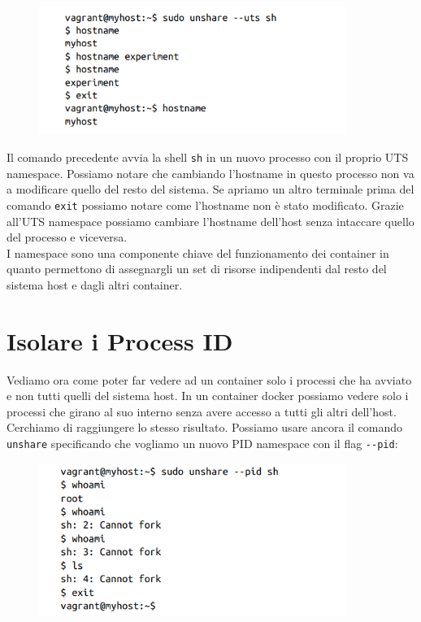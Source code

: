 \begin{figure}[H]
    \centering
    \includegraphics[width=10cm, keepaspectratio]{capitoli/os_security/imgs/hostname2.png}
\end{figure}

Il comando precedente avvia la shell \verb|sh| in un nuovo processo con il proprio
UTS namespace. Possiamo notare che cambiando l'hostname in questo processo
non va a modificare quello del resto del sistema. Se apriamo un altro terminale
prima del comando \verb|exit| possiamo notare come l'hostname non è stato
modificato. Grazie all'UTS namespace possiamo
cambiare l'hostname dell'host senza intaccare quello del processo e viceversa.\\

I namespace sono una componente chiave del funzionamento dei container in quanto
permettono di assegnargli un set di risorse indipendenti dal resto del sistema host
e dagli altri container.

\section{Isolare i Process ID}

Vediamo ora come poter far vedere ad un container solo i processi che ha avviato e
non tutti quelli del sistema host.
In un container docker possiamo vedere solo i processi che girano al suo interno
senza avere accesso a tutti gli altri dell'host. Cerchiamo di raggiungere lo
stesso risultato. Possiamo usare ancora il comando \verb|unshare| specificando
che vogliamo un nuovo PID namespace con il flag \verb|--pid|:


\begin{figure}[H]
    \centering
    \includegraphics[width=10cm, keepaspectratio]{capitoli/os_security/imgs/pid1.png}
\end{figure}

